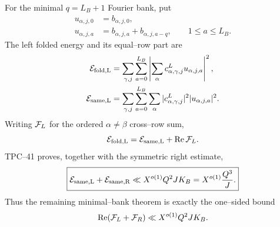 For the minimal \(q=L_B+1\) Fourier bank, put
\begin{align}
 u_{\alpha,j,0}&=b_{\alpha,j,0},
 \label{eq:tpc42-folded-u0}\\
 u_{\alpha,j,a}
 &=b_{\alpha,j,a}+b_{\alpha,j,a-q},
 \qquad 1\le a\le L_B.
 \label{eq:tpc42-folded-ua}
\end{align}
The left folded energy and its equal--row part are
\begin{align}
 \mathcal E_{\rm fold,L}
 &=\sum_{\gamma,j}\sum_{a=0}^{L_B}
   \left|\sum_\alpha
   c^L_{\alpha,\gamma,j}u_{\alpha,j,a}\right|^2,
 \label{eq:tpc42-folded-energy}\\
 \mathcal E_{\rm same,L}
 &=\sum_{\gamma,j}\sum_{a=0}^{L_B}\sum_\alpha
   |c^L_{\alpha,\gamma,j}|^2|u_{\alpha,j,a}|^2.
 \label{eq:tpc42-same-energy}
\end{align}
Writing \(\mathcal F_L\) for the ordered \(\alpha\ne\beta\) cross--row sum,
\begin{equation}
 \mathcal E_{\rm fold,L}
 =\mathcal E_{\rm same,L}+\operatorname{Re}\mathcal F_L.
 \label{eq:tpc42-folded-split}
\end{equation}
TPC--41 proves, together with the symmetric right estimate,
\begin{equation}
 \boxed{
 \mathcal E_{\rm same,L}+\mathcal E_{\rm same,R}
 \ll X^{o(1)}Q^2JK_B
 =X^{o(1)}\frac{Q^3}{J}.}
 \label{eq:tpc42-inherited-same-bound}
\end{equation}
Thus the remaining minimal--bank theorem is exactly the one--sided bound
\begin{equation}
 \operatorname{Re}(\mathcal F_L+\mathcal F_R)
 \ll X^{o(1)}Q^2JK_B.
 \label{eq:tpc42-inherited-gate}
\end{equation}
